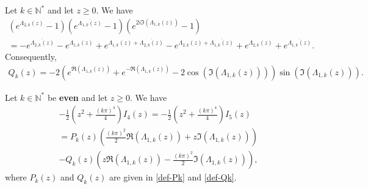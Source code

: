 \documentclass[10pt,a4paper]{amsart}
\newcommand{\mN}{\mathbb{N}}
\begin{document}
\begin{lemma} \label{lem-Qk} Let $k \in \mN^*$ and let $z \ge 0$. We have 
\begin{multline} \label{lem-Qk-cl1}
\left(e^{\Lambda_{2,k}(z)} - 1 \right) \left(e^{\overline{\Lambda_{1,k}(z)}} - 1 \right) \left(e^{2i \Im (\Lambda_{1,k}(z)) } - 1 \right) \\[6pt]
= - e^{\overline{\Lambda_{2, k}(z)}} - e^{\Lambda_{1, k}(z)} +  e^{\Lambda_{1,k}(z) + \overline{\Lambda_{2,k}(z)}} 
- e^{\Lambda_{2,k}(z) + \overline{\Lambda_{1,k}(z)}} + e^{\Lambda_{2,k}(z)} + e^{\overline{\Lambda_{1,k}(z)}}. 
\end{multline}
Consequently,  
\begin{align} \label{lem-Qk-cl2} 
 Q_k(z) = - 2 \left(e^{\Re (\Lambda_{1,k}(z))} + e^{-\Re (\Lambda_{1,k}(z))} - 2 \cos (\Im (\Lambda_{1,k}(z)) ) \right)  \sin (\Im (\Lambda_{1,k}(z))).
\end{align}
\end{lemma}

\begin{lemma} \label{lem-I4I5} Let $k \in \mN^*$ be {\bf even} and let $z \ge 0$. We have
\begin{multline}	\label{I4=I5}
- \frac{1}{2} \left(z^2 + \frac{(k \pi)^4}{4} \right) I_4(z)  = - \frac{1}{2} \left(z^2 + \frac{(k \pi)^4}{4} \right) I_5(z) 
\\[6pt]
=  P_k (z) \left( \frac{(k \pi)^2}{2}\Re (\Lambda_{1,k}(z)) + z \Im (\Lambda_{1,k}(z)) \right) \\
 -  Q_k(z) \left(z\Re (\Lambda_{1,k}(z))  - \frac{(k \pi)^2}{2} \Im (\Lambda_{1,k}(z)) \right) ,
\end{multline}
where $P_k(z)$ and $Q_k(z)$ are given in \eqref{def-Pk} and \eqref{def-Qk}. 
\end{lemma}
\end{document}
